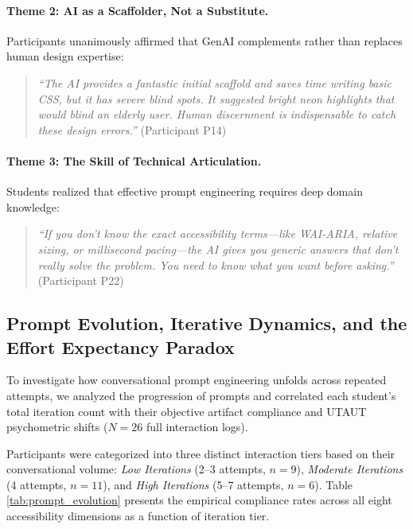\documentclass{cleiej}
\begin{document}
\paragraph{Theme 2: AI as a Scaffolder, Not a Substitute.}
Participants unanimously affirmed that GenAI complements rather than replaces human design expertise:
\begin{quote}
\textit{``The AI provides a fantastic initial scaffold and saves time writing basic CSS, but it has severe blind spots. It suggested bright neon highlights that would blind an elderly user. Human discernment is indispensable to catch these design errors.''} (Participant P14)
\end{quote}

\paragraph{Theme 3: The Skill of Technical Articulation.}
Students realized that effective prompt engineering requires deep domain knowledge:
\begin{quote}
\textit{``If you don't know the exact accessibility terms---like WAI-ARIA, relative sizing, or millisecond pacing---the AI gives you generic answers that don't really solve the problem. You need to know what you want before asking.''} (Participant P22)
\end{quote}

\subsection{Prompt Evolution, Iterative Dynamics, and the Effort Expectancy Paradox}
\label{subsec:prompt_evolution}
To investigate how conversational prompt engineering unfolds across repeated attempts, we analyzed the progression of prompts and correlated each student's total iteration count with their objective artifact compliance and UTAUT psychometric shifts ($N = 26$ full interaction logs). 

Participants were categorized into three distinct interaction tiers based on their conversational volume: \textit{Low Iterations} (2--3 attempts, $n = 9$), \textit{Moderate Iterations} (4 attempts, $n = 11$), and \textit{High Iterations} (5--7 attempts, $n = 6$). Table \ref{tab:prompt_evolution} presents the empirical compliance rates across all eight accessibility dimensions as a function of iteration tier.
\end{document}
